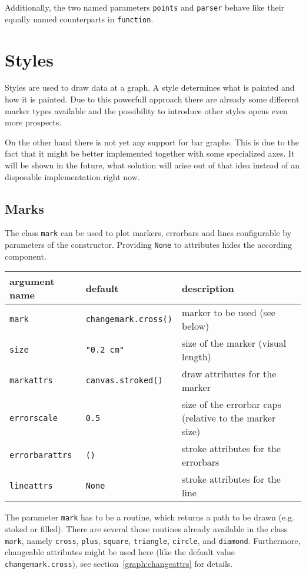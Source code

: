 Additionally, the two named parameters \verb|points| and \verb|parser|
behave like their equally named counterparts in \verb|function|.

\section{Styles}
\label{graph:styles}

Styles are used to draw data at a graph. A style determines what is
painted and how it is painted. Due to this powerfull approach there
are already some different marker types available and the possibility
to introduce other styles opens even more prospects.

On the other hand there is not yet any support for bar graphs. This is
due to the fact that it might be better implemented together with some
specialized axes. It will be shown in the future, what solution will
arise out of that idea instead of an disposable implementation right
now.

\subsection{Marks}

The class \verb|mark| can be used to plot markers, errorbars and lines
configurable by parameters of the constructor. Providing \verb|None|
to attributes hides the according component.

\medskip
\begin{tabularx}{\linewidth}{ll>{\raggedright\arraybackslash}X}
argument name&default&description\\
\hline
\texttt{mark}&\texttt{changemark.cross()}&marker to be used (see below)\\
\texttt{size}&\texttt{"0.2 cm"}&size of the marker (visual length)\\
\texttt{markattrs}&\texttt{canvas.stroked()}&draw attributes for the marker\\
\texttt{errorscale}&\texttt{0.5}&size of the errorbar caps (relative to the marker size)\\
\texttt{errorbarattrs}&\texttt{()}&stroke attributes for the errorbars\\
\texttt{lineattrs}&\texttt{None}&stroke attributes for the line\\
\end{tabularx}
\medskip

The parameter \verb|mark| has to be a routine, which returns a path to
be drawn (e.g. stoked or filled). There are several those routines
already available in the class \verb|mark|, namely \verb|cross|,
\verb|plus|, \verb|square|, \verb|triangle|, \verb|circle|, and
\verb|diamond|. Furthermore, changeable attributes might be used here
(like the default value \verb|changemark.cross|), see
section~\ref{graph:changeattrs} for details.

